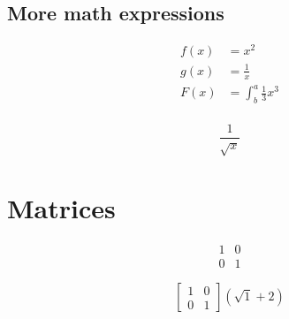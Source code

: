 \documentclass{article}
\begin{document}
\subsection{More math expressions}
\begin{align*}
    f(x) & = x^2                     \\
    g(x) & = \frac{1}{x}             \\
    F(x) & = \int^a_b \frac{1}{3}x^3 \\
\end{align*}

\begin{equation*}
    \frac{1}{\sqrt{x}}
\end{equation*}

\section{Matrices}

\begin{equation}
    \begin{matrix}
        1 & 0 \\
        0 & 1
    \end{matrix}
\end{equation}

\begin{equation}
    \left[
        \begin{matrix}
            1 & 0 \\
            0 & 1
        \end{matrix}
        \right]
    \left(\sqrt{1} + 2\right)
\end{equation}
\end{document}
